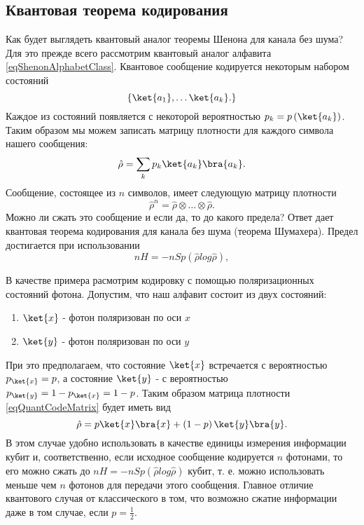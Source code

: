 \subsection{Квантовая теорема кодирования}
Как будет выглядеть квантовый аналог теоремы Шенона для канала без
шума? Для это прежде всего рассмотрим квантовый аналог алфавита
\eqref{eqShenonAlphabetClass}. Квантовое сообщение кодируется
некоторым набором состояний 
\begin{equation}
\left\{
\ket{a_1}, \dotsc \ket{a_k}.
\right\}
\label{eqSchumacherAlphabet}
\end{equation}
Каждое из состояний появляется с некоторой вероятностью $p_k =
p\left(\ket{a_k}\right)$. Таким образом мы можем записать
матрицу плотности для каждого символа нашего сообщения:
\begin{equation}
\hat{\rho} = \sum_k p_k \ket{a_k}\bra{a_k}.
\label{eqQuantCodeMatrix}
\end{equation}
Сообщение, состоящее из $n$ символов, имеет следующую матрицу плотности
\begin{equation}
\hat{\rho}^n = \hat{\rho}\otimes \dots \otimes \hat{\rho}.
\nonumber
\end{equation}
Можно ли сжать это сообщение и если да, то до какого предела? Ответ
дает квантовая теорема кодирования для канала без шума (теорема
Шумахера). Предел достигается при использовании 
\begin{equation}
n H = - n Sp \left(\hat{\rho} log \hat{\rho} \right),
\nonumber
\end{equation}

В качестве примера расмотрим кодировку с помощью поляризационных
состояний фотона. Допустим, что наш алфавит состоит из двух
состояний:
\begin{enumerate}
\item $\ket{x}$ - фотон поляризован по оси $x$ 
\item $\ket{y}$ - фотон поляризован по оси $y$
\end{enumerate}
При это предполагаем, что состояние $\ket{x}$ встречается с
вероятностью $p_{\ket{x}} = p$, а состояние $\ket{y}$ - с
вероятностью $p_{\ket{y}} = 1 - p_{\ket{x}} = 1 - p$.
Таким образом матрица плотности 
\eqref{eqQuantCodeMatrix} будет
иметь вид
\begin{equation}
\hat{\rho} = p \ket{x}\bra{x} + \left(1 - p\right)
\ket{y}\bra{y}.
\label{eqQuantCodeMatrixQBIT}
\end{equation}
В этом случае удобно
использовать в качестве единицы измерения информации кубит и, соответственно,
если исходное сообщение кодируется $n$ фотонами, то его можно
сжать до 
\(
n H = - n Sp \left(\hat{\rho} log \hat{\rho} \right)
\)
кубит, т. е. можно использовать меньше чем $n$ фотонов  для передачи
этого сообщения. Главное отличие квантового случая от классического в
том, что возможно сжатие информации даже в том случае, если $p =
\frac{1}{2}$. 





